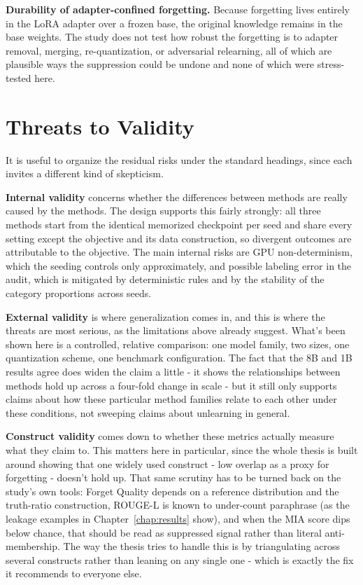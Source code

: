 \documentclass[a4paper,12pt]{report}
\begin{document}
\textbf{Durability of adapter-confined forgetting.} Because forgetting lives entirely in the LoRA adapter over a frozen base, the original knowledge remains in the base weights. The study does not test how robust the forgetting is to adapter removal, merging, re-quantization, or adversarial relearning, all of which are plausible ways the suppression could be undone and none of which were stress-tested here.

\section{Threats to Validity}
\label{sec:disc-threats}
It is useful to organize the residual risks under the standard headings, since each invites a different kind of skepticism.

\textbf{Internal validity} concerns whether the differences between methods are really caused by the methods. The design supports this fairly strongly: all three methods start from the identical memorized checkpoint per seed and share every setting except the objective and its data construction, so divergent outcomes are attributable to the objective. The main internal risks are GPU non-determinism, which the seeding controls only approximately, and possible labeling error in the audit, which is mitigated by deterministic rules and by the stability of the category proportions across seeds.

\textbf{External validity} is where generalization comes in, and this is where the threats are most serious, as the limitations above already suggest. What's been shown here is a controlled, relative comparison: one model family, two sizes, one quantization scheme, one benchmark configuration. The fact that the 8B and 1B results agree does widen the claim a little - it shows the relationships between methods hold up across a four-fold change in scale - but it still only supports claims about how these particular method families relate to each other under these conditions, not sweeping claims about unlearning in general.

\textbf{Construct validity} comes down to whether these metrics actually measure what they claim to. This matters here in particular, since the whole thesis is built around showing that one widely used construct - low overlap as a proxy for forgetting - doesn't hold up. That same scrutiny has to be turned back on the study's own tools: Forget Quality depends on a reference distribution and the truth-ratio construction, ROUGE-L is known to under-count paraphrase (as the leakage examples in Chapter~\ref{chap:results} show), and when the MIA score dips below chance, that should be read as suppressed signal rather than literal anti-membership. The way the thesis tries to handle this is by triangulating across several constructs rather than leaning on any single one - which is exactly the fix it recommends to everyone else.
\end{document}
